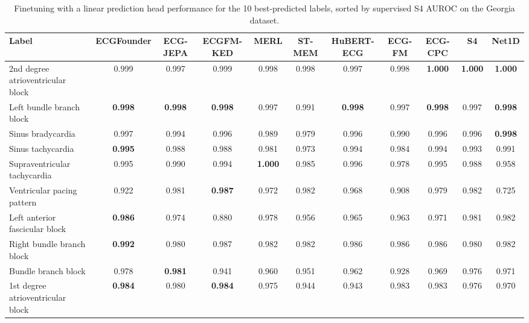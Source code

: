 \documentclass{article}
\begin{document}
                \begin{table}[htbp]
                    \centering
                    \tiny
                    \setlength{\tabcolsep}{2pt}
                    \caption{Finetuning with a linear prediction head performance for the 10 best-predicted labels, sorted by supervised S4 AUROC on the Georgia dataset.}
                    \begin{tabular}{lcccccccccc}
                        \toprule
                        \textbf{Label} & \textbf{ECGFounder} & \textbf{ECG-JEPA} & \textbf{ECGFM-KED} & \textbf{MERL} & \textbf{ST-MEM} & \textbf{HuBERT-ECG} & \textbf{ECG-FM} & \textbf{ECG-CPC} & \textbf{S4} & \textbf{Net1D} \\
                        \midrule
                        2nd degree atrioventricular block & 0.999 & 0.997 & 0.999 & 0.998 & 0.998 & 0.997 & 0.998 & \textbf{1.000} & \textbf{1.000} & \textbf{1.000} \\
                        Left bundle branch block & \textbf{0.998} & \textbf{0.998} & \textbf{0.998} & 0.997 & 0.991 & \textbf{0.998} & 0.997 & \textbf{0.998} & 0.997 & \textbf{0.998} \\
                        Sinus bradycardia & 0.997 & 0.994 & 0.996 & 0.989 & 0.979 & 0.996 & 0.990 & 0.996 & 0.996 & \textbf{0.998} \\
                        Sinus tachycardia & \textbf{0.995} & 0.988 & 0.988 & 0.981 & 0.973 & 0.994 & 0.984 & 0.994 & 0.993 & 0.991 \\
                        Supraventricular tachycardia & 0.995 & 0.990 & 0.994 & \textbf{1.000} & 0.985 & 0.996 & 0.978 & 0.995 & 0.988 & 0.958 \\
                        Ventricular pacing pattern & 0.922 & 0.981 & \textbf{0.987} & 0.972 & 0.982 & 0.968 & 0.908 & 0.979 & 0.982 & 0.725 \\
                        Left anterior fascicular block & \textbf{0.986} & 0.974 & 0.880 & 0.978 & 0.956 & 0.965 & 0.963 & 0.971 & 0.981 & 0.982 \\
                        Right bundle branch block & \textbf{0.992} & 0.980 & 0.987 & 0.982 & 0.982 & 0.986 & 0.986 & 0.986 & 0.980 & 0.982 \\
                        Bundle branch block & 0.978 & \textbf{0.981} & 0.941 & 0.960 & 0.951 & 0.962 & 0.928 & 0.969 & 0.976 & 0.971 \\
                        1st degree atrioventricular block & \textbf{0.984} & 0.980 & \textbf{0.984} & 0.975 & 0.944 & 0.943 & 0.983 & 0.983 & 0.976 & 0.970 \\
                        \bottomrule
                    \end{tabular}
                    \label{tab:results_overview_georgia}
                \end{table}
\end{document}
